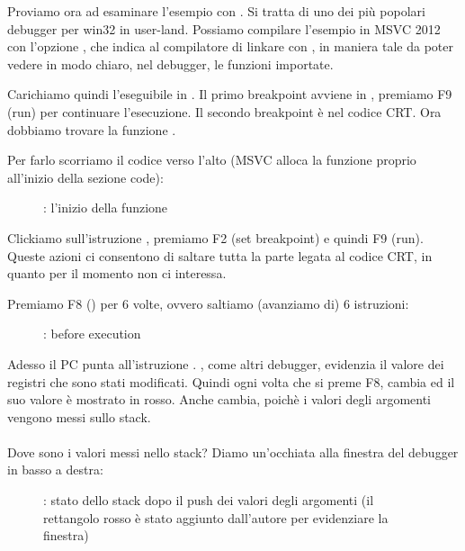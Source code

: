 \clearpage
{}
\myindex{\olly}

Proviamo ora ad esaminare l'esempio con \olly.
Si tratta di uno dei più popolari debugger per win32 in user-land.
Possiamo compilare l'esempio in MSVC 2012 con l'opzione , che indica al compilatore di linkare con ,
in maniera tale da poter vedere in modo chiaro, nel debugger, le funzioni importate.

Carichiamo quindi l'eseguibile in \olly.
Il primo breakpoint avviene in ,
premiamo F9 (run) per continuare l'esecuzione.
Il secondo breakpoint è nel codice \ac{CRT}.
Ora dobbiamo trovare la funzione \main.

Per farlo scorriamo il codice verso l'alto (MSVC alloca la funzione \main proprio all'inizio della sezione code):
\begin{figure}[H]
\centering
{}
\caption{\olly: l'inizio della funzione \main}
\label{fig:printf3_olly_1}
\end{figure}

Clickiamo sull'istruzione , premiamo F2 (set breakpoint) e quindi F9 (run).
Queste azioni ci consentono di saltare tutta la parte legata al codice \ac{CRT}, in quanto per il momento non ci interessa.

\clearpage
Premiamo F8 (\stepover) per 6 volte, ovvero saltiamo (avanziamo di) 6 istruzioni:

\begin{figure}[H]
\centering
{}
\caption{\olly: before \printf execution}
\label{fig:printf3_olly_2}
\end{figure}

Adesso il \ac{PC} punta all'istruzione .
\olly, come altri debugger, evidenzia il valore dei registri che sono stati modificati.
Quindi ogni volta che si preme F8, \EIP cambia ed il suo valore è mostrato in rosso.
Anche \ESP cambia, poichè i valori degli argomenti vengono messi sullo stack.\\
\\
Dove sono i valori messi nello stack?
Diamo un'occhiata alla finestra del debugger in basso a destra:

\begin{figure}[H]
\centering

\caption{\olly: stato dello stack dopo il push dei valori degli argomenti (il rettangolo rosso è stato aggiunto dall'autore per evidenziare la finestra)}
\end{figure}


